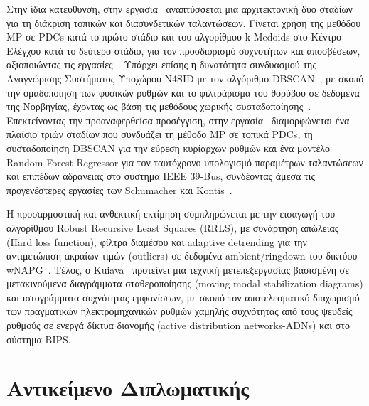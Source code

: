 Στην ίδια κατεύθυνση, στην εργασία~\cite{estimation2021} αναπτύσσεται μια αρχιτεκτονική δύο σταδίων για τη διάκριση τοπικών και διασυνδετικών ταλαντώσεων. Γίνεται χρήση της μεθόδου \textenglish{MP} σε \textenglish{PDCs} κατά το πρώτο στάδιο και του αλγορίθμου \textenglish{k-Medoids} στο Κέντρο Ελέγχου κατά το δεύτερο στάδιο, για τον προσδιορισμό συχνοτήτων και αποσβέσεων, αξιοποιώντας τις εργασίες~\cite{ning2015twolevel,kaufman2009finding}. Υπάρχει επίσης η δυνατότητα συνδυασμού της Αναγνώρισης Συστήματος Υποχώρου \textenglish{N4SID} με τον αλγόριθμο \textenglish{DBSCAN}~\cite{zeno2023improvement}, με σκοπό την ομαδοποίηση των φυσικών ρυθμών και το φιλτράρισμα του θορύβου σε δεδομένα της Νορβηγίας, έχοντας ως βάση τις μεθόδους χωρικής συσταδοποίησης~\cite{dbscan1996,patel2022identification}. Επεκτείνοντας την προαναφερθείσα προσέγγιση, στην εργασία~\cite{sfetkos2024measurement} διαμορφώνεται ένα πλαίσιο τριών σταδίων που συνδυάζει τη μέθοδο \textenglish{MP} σε τοπικά \textenglish{PDCs}, τη συσταδοποίηση \textenglish{DBSCAN} για την εύρεση κυρίαρχων ρυθμών και ένα μοντέλο \textenglish{Random Forest Regressor} για τον ταυτόχρονο υπολογισμό παραμέτρων ταλαντώσεων και επιπέδων αδράνειας στο σύστημα \textenglish{IEEE 39-Bus}, συνδέοντας άμεσα τις προγενέστερες εργασίες των \textenglish{Schumacher} και \textenglish{Kontis}~\cite{schumacher2022clusteredr3ls,estimation2021}.

Η προσαρμοστική και ανθεκτική εκτίμηση συμπληρώνεται με την εισαγωγή του αλγορίθμου \textenglish{Robust Recursive Least Squares} (\textenglish{RRLS}), με συνάρτηση απώλειας (\textenglish{Hard loss function}), φίλτρα διαμέσου και \textenglish{adaptive detrending} για την αντιμετώπιση ακραίων τιμών (\textenglish{outliers}) σε δεδομένα \textenglish{ambient/ringdown} του δικτύου \textenglish{wNAPG}~\cite{zhou2007robust}. Τέλος, ο \textenglish{Kuiava}~\cite{kuiava2021separating} προτείνει μια τεχνική μετεπεξεργασίας βασισμένη σε μετακινούμενα διαγράμματα σταθεροποίησης (\textenglish{moving modal stabilization diagrams}) και ιστογράμματα συχνότητας εμφανίσεων, με σκοπό τον αποτελεσματικό διαχωρισμό των πραγματικών ηλεκτρομηχανικών ρυθμών χαμηλής συχνότητας από τους ψευδείς ρυθμούς σε ενεργά δίκτυα διανομής (\textenglish{active distribution networks-ADNs}) και στο σύστημα \textenglish{BIPS}.

\section{Αντικείμενο Διπλωματικής}

